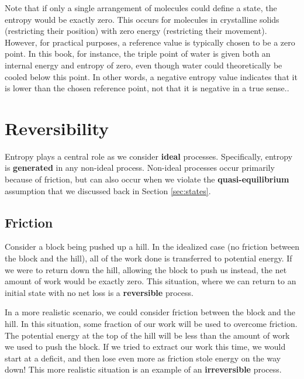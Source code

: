 Note that if only a single arrangement of molecules could define a state, the entropy would be exactly zero.  This occurs for molecules in crystalline solids (restricting their position) with zero energy (restricting their movement).  However, for practical purposes, a reference value is typically chosen to be a zero point.  In this book, for instance, the triple point of water is given both an internal energy and entropy of zero, even though water could theoretically be cooled below this point.  In other words, a negative entropy value indicates that it is lower than the chosen reference point, not that it is negative in a true sense..


\section{Reversibility} \label{sec:reversibility}

Entropy plays a central role as we consider {\bf ideal} processes.  Specifically, entropy is {\bf generated} in any non-ideal process.  Non-ideal processes occur primarily because of friction, but can also occur when we violate the {\bf quasi-equilibrium} assumption that we discussed back in Section \ref{sec:states}.

\subsection{Friction}

Consider a block being pushed up a hill.  In the idealized case (no friction between the block and the hill), all of the work done is transferred to potential energy.  If we were to return down the hill, allowing the block to push us instead, the net amount of work would be exactly zero.  This situation, where we can return to an initial state with no net loss is a {\bf reversible} process.

In a more realistic scenario, we could consider friction between the block and the hill.  In this situation, some fraction of our work will be used to overcome friction.  The potential energy at the top of the hill will be less than the amount of work we used to push the block.  If we tried to extract our work this time, we would start at a deficit, and then lose even more as friction stole energy on the way down!  This more realistic situation is an example of an {\bf irreversible} process.

